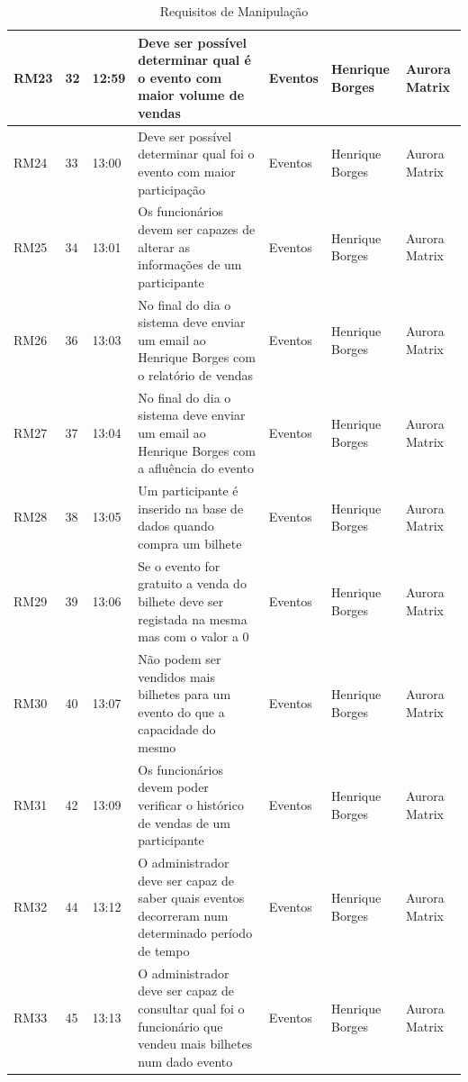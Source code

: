 \documentclass[a4paper,12pt]{scrreprt}
\begin{document}
\begin{table}[H]
{\begin{tabular}{|l|l|l|>{\raggedright\arraybackslash}p{12cm}|l|l|l|}
        RM23 & 32 & 12:59 & Deve ser possível determinar qual é o evento com maior volume de vendas & Eventos & Henrique Borges & Aurora Matrix \\ \hline
        RM24 & 33 & 13:00 & Deve ser possível determinar qual foi o evento com maior participação & Eventos & Henrique Borges & Aurora Matrix \\ \hline
        RM25 & 34 & 13:01 & Os funcionários devem ser capazes de alterar as informações de um participante & Eventos & Henrique Borges & Aurora Matrix \\ \hline
        RM26 & 36 & 13:03 & No final do dia o sistema deve enviar um email ao Henrique Borges com o relatório de vendas & Eventos & Henrique Borges & Aurora Matrix \\ \hline
        RM27 & 37 & 13:04 & No final do dia o sistema deve enviar um email ao Henrique Borges com a afluência do evento & Eventos & Henrique Borges & Aurora Matrix \\ \hline
        RM28 & 38 & 13:05 & Um participante é inserido na base de dados quando compra um bilhete & Eventos & Henrique Borges & Aurora Matrix \\ \hline
        RM29 & 39 & 13:06 & Se o evento for gratuito a venda do bilhete deve ser registada na mesma mas com o valor a 0 & Eventos & Henrique Borges & Aurora Matrix \\ \hline
        RM30 & 40 & 13:07 & Não podem ser vendidos mais bilhetes para um evento do que a capacidade do mesmo & Eventos & Henrique Borges & Aurora Matrix \\ \hline
        RM31 & 42 & 13:09 & Os funcionários devem poder verificar o histórico de vendas de um participante & Eventos & Henrique Borges & Aurora Matrix \\ \hline
        RM32 & 44 & 13:12 & O administrador deve ser capaz de saber quais eventos decorreram num determinado período de tempo & Eventos & Henrique Borges & Aurora Matrix \\ \hline
        RM33 & 45 & 13:13 & O administrador deve ser capaz de consultar qual foi o funcionário que vendeu mais bilhetes num dado evento & Eventos & Henrique Borges & Aurora Matrix \\ \hline
    \end{tabular}%
}
    \caption{Requisitos de Manipulação}
\end{table}
\end{document}
